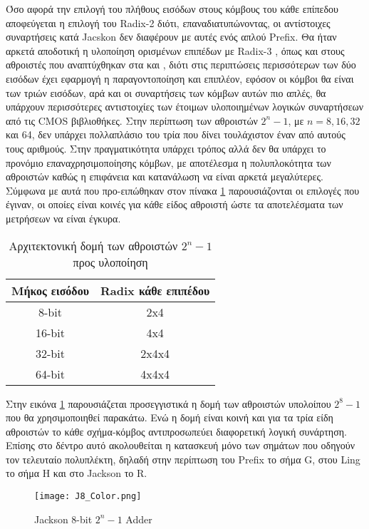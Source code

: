 Όσο αφορά την επιλογή του πλήθους εισόδων στους κόμβους του κάθε επίπεδου αποφεύγεται
η επιλογή του Radix-2 διότι, επαναδιατυπώνοντας, οι αντίστοιχες συναρτήσεις κατά Jacskon δεν διαφέρουν 
με αυτές ενός απλού Prefix. Θα ήταν αρκετά αποδοτική η υλοποίηση ορισμένων επιπέδων με Radix-3
, όπως και στους αθροιστές που αναπτύχθηκαν στα \cite{6189978} και \cite{6810474}, διότι
στις περιπτώσεις περισσότερων των δύο εισόδων έχει εφαρμογή η παραγοντοποίηση και επιπλέον, εφόσον 
οι κόμβοι θα είναι των τριών εισόδων, αρά και οι συναρτήσεις των κόμβων αυτών
πιο απλές, θα υπάρχουν περισσότερες 
αντιστοιχίες των έτοιμων υλοποιημένων λογικών συναρτήσεων από τις CMOS βιβλιοθήκες. Στην περίπτωση των 
αθροιστών $2^n-1$, με $n=8, 16, 32$ και 64, δεν υπάρχει πολλαπλάσιο του τρία που δίνει τουλάχιστον έναν 
από αυτούς τους αριθμούς. Στην πραγματικότητα υπάρχει τρόπος αλλά δεν θα υπάρχει το προνόμιο επαναχρησιμοποίησης κόμβων, με αποτέλεσμα η πολυπλοκότητα των
αθροιστών καθώς η επιφάνεια και κατανάλωση να είναι αρκετά μεγαλύτερες.
Σύμφωνα με αυτά που προ-ειπώθηκαν στον πίνακα \ref{tb:arch_2^n-1} παρουσιάζονται οι επιλογές που έγιναν, οι οποίες
είναι κοινές για κάθε είδος αθροιστή ώστε τα αποτελέσματα των μετρήσεων να είναι έγκυρα.
\begin{table}[H]
\centering
     \begin{tabular}{ || c | c || } 
     \hline
     Μήκος εισόδου & Radix κάθε επιπέδου\\
     \hline\hline
     8-bit  & 2x4 \\
     16-bit & 4x4 \\
     32-bit & 2x4x4 \\
     64-bit & 4x4x4 \\
     \hline
     \end{tabular}
     \caption{Αρχιτεκτονική δομή των αθροιστών $2^n-1$ προς υλοποίηση}
     \label{tb:arch_2^n-1}
\end{table}

Στην εικόνα \ref{2^8-1_Tree_2x4} παρουσιάζεται προσεγγιστικά η δομή των αθροιστών υπολοίπου $2^8-1$ 
που θα χρησιμοποιηθεί παρακάτω. Ενώ η δομή είναι κοινή και για τα τρία είδη αθροιστών το κάθε σχήμα-κόμβος
αντιπροσωπεύει διαφορετική λογική συνάρτηση. Επίσης στο δέντρο αυτό ακολουθείται η κατασκευή μόνο 
των σημάτων που οδηγούν τον τελευταίο πολυπλέκτη, δηλαδή στην περίπτωση του Prefix το σήμα G, στου Ling
το σήμα H και στο Jackson το R.
\begin{figure}[H]
    \centering
    \texttt{[image: J8\_Color.png]}
    \caption{Jackson 8-bit $2^n-1$ Adder}
    \label{2^8-1_Tree_2x4}
\end{figure}


















